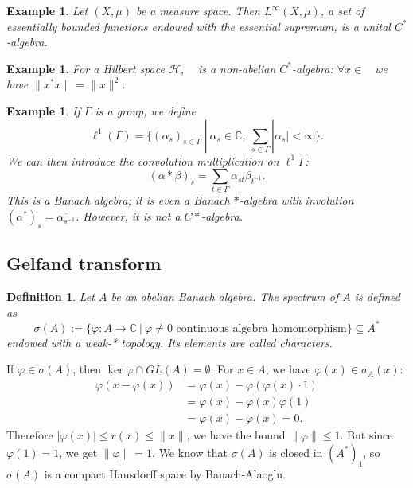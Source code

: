 \documentclass[10pt, a4paper]{article}
\newtheorem{defi}[thm]{Definition}
\newenvironment{noticeB}{%
  \tcolorbox[%
  notitle,
  empty,
  enhanced,  %
  breakable,
  coltext=black,
  colback=white, 
  fontupper=\rmfamily,
  noparskip,
  sharp corners,
  boxrule=-1pt,  %
  frame hidden,
  left=7pt,  %
  right=7pt,
  top=5pt,
  bottom=5pt,
  before skip=2.5ex plus 2pt,
  after skip=2.5ex plus 2pt,
  borderline west = {1.5pt}{-0.1pt}{blue!30!black}, %
  overlay unbroken and last={%
    \draw[color=black, line width=1.25pt]
    ($(frame.south west)+(1.pt, -0.1pt)$) -- ++(2em, 0);
  }
  ]}
{\endtcolorbox}
\newenvironment{definition}{\begin{noticeB}\begin{defi}}{%
    \end{defi}\end{noticeB}}
\newtheorem{example}[thm]{Example}
\newcommand{\C}{\mathbb {C}}
\DeclareMathOperator{\bh}{\mathcal{B} (\mathcal{H})}
\begin{document}
\begin{example}
  Let $(X, \mu)$ be a measure space.
  Then $L^\infty (X, \mu)$, a set of essentially bounded functions endowed with the essential supremum, is a unital $C^*$-algebra.
\end{example}

\begin{example}
  For a Hilbert space $\mathcal{H}$, $\bh$ is a non-abelian $C^*$-algebra:
  $\forall x \in \bh$ we have $\| x^* x\| = \|x\|^2$.
\end{example}

\begin{example}
  If $\Gamma$ is a group, we define 
  $$\ell^1 (\Gamma) = \{(\alpha_s)_{s \in \Gamma}\ |\ \alpha_s \in \C,\ \sum_{s \in \Gamma} |\alpha_s| < \infty\}.$$
  We can then introduce the convolution multiplication on $\ell^1 \Gamma$:
  $$(\alpha * \beta)_s = \sum_{t \in \Gamma} \alpha_{st} \beta_{t^{-1}}.$$
  This is a Banach algebra; it is even a Banach $*$-algebra with involution 
  $(\alpha^*)_s = \overline{\alpha_{s^{-1}}}$. However, it is not a $ C*$-algebra.
\end{example}

\subsection{Gelfand transform}

\begin{definition}
  Let $A$ be an abelian Banach algebra. The spectrum of $A$ is defined as
  $$\sigma (A) := \{\varphi: A \to \C\ |\ \textrm{$\varphi \neq 0$ continuous algebra homomorphism}\} \subseteq A^*$$
  endowed with a weak-* topology. Its elements are called characters.
\end{definition}

If $\varphi \in \sigma (A)$, then $\ker \varphi \cap GL(A) = \emptyset.$
For $x \in A$, we have $\varphi(x) \in \sigma_A(x)$:
\begin{align*}
  \varphi(x - \varphi(x)) &= \varphi(x) - \varphi(\varphi(x) \cdot 1)\\
  &= \varphi(x) - \varphi(x) \varphi(1)\\
  &= \varphi(x) - \varphi(x) = 0.
\end{align*}
Therefore $|\varphi(x)| \leq r(x)\leq \|x\|$, we have the bound $\|\varphi\| \leq 1$.
But since $\varphi(1) = 1$, we get $\|\varphi\| = 1$.
We know that $\sigma (A)$ is closed in $(A^*)_1$, so $\sigma(A)$ is a compact Hausdorff space by Banach-Alaoglu.
\end{document}
